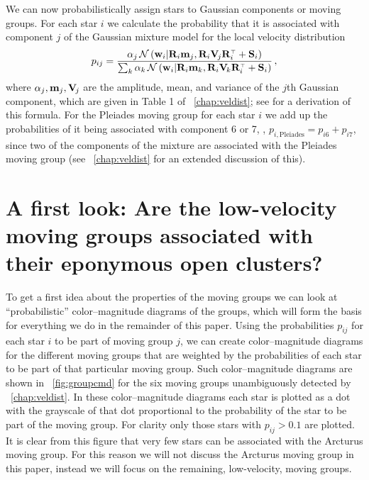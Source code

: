 We can now probabilistically assign stars to Gaussian components or
moving groups. For each star $i$ we calculate the probability that it
is associated with component $j$ of the Gaussian mixture model for the
local velocity distribution
\begin{equation}\label{eq:pij}
p_{ij} = \frac{\alpha_j\,\mathcal{N}\left(\mathbf{w}_i | \mathbf{R}_i \mathbf{m}_j, \mathbf{R}_i \mathbf{V}_{\!j}
\mathbf{R}_i^{\scriptscriptstyle \top} + \mathbf{S}_i\right)}{\sum_k\alpha_k\,\mathcal{N}\left(\mathbf{w}_i | \mathbf{R}_i \mathbf{m}_k, \mathbf{R}_i \mathbf{V}_{\!k}
\mathbf{R}_i^{\scriptscriptstyle \top}+\mathbf{S}_i\right)}\,,
\end{equation}
where $\alpha_j,\mathbf{m}_j,\mathbf{V}_{\!j}$ are the amplitude, mean, and variance of
the $j$th Gaussian component, which are given in Table 1
of \chaptername~\ref{chap:veldist}; see
\citet{BovyXD} for a derivation of this formula. For the Pleiades
moving group for each star $i$ we add up the probabilities of it being
associated with component 6 or 7, \ie, $p_{i,\mathrm{Pleiades}} =
p_{i6}+p_{i7}$, since two of the components of the mixture are
associated with the Pleiades moving group
(see \chaptername~\ref{chap:veldist} for an extended discussion of
this).



\section{A first look: Are the low-velocity moving groups associated with their eponymous open clusters?}\label{sec:firstlook}

To get a first idea about the properties of the moving groups we can
look at ``probabilistic'' color--magnitude diagrams of the groups,
which will form the basis for everything we do in the remainder of
this paper. Using the probabilities $p_{ij}$ for each star $i$ to be
part of moving group $j$, we can create color--magnitude diagrams for
the different moving groups that are weighted by the probabilities of
each star to be part of that particular moving group. Such
color--magnitude diagrams are shown in \figurename~\ref{fig:groupcmd}
for the six moving groups unambiguously detected
by \chaptername~\ref{chap:veldist}. In these color--magnitude diagrams
each star is plotted as a dot with the grayscale of that dot
proportional to the probability of the star to be part of the moving
group. For clarity only those stars with $p_{ij} > 0.1$ are
plotted. It is clear from this figure that very few stars can be
associated with the Arcturus moving group. For this reason we will not
discuss the Arcturus moving group in this paper, instead we will focus
on the remaining, low-velocity, moving groups.

